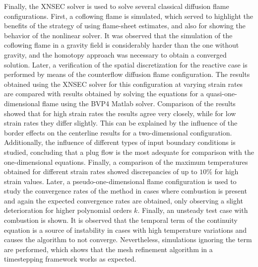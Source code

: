 Finally, the XNSEC solver is used to solve several classical diffusion flame configurations. First, a coflowing flame is simulated, which served to highlight the benefits of the strategy of using flame-sheet estimates, and also for showing the behavior of the nonlinear solver. It was observed that the simulation of the coflowing flame in a gravity field is considerably harder than the one without gravity, and the homotopy approach was necessary to obtain a converged solution. Later, a verification of the spatial discretization for the reactive case is performed by means of the counterflow diffusion flame configuration. The results obtained using the XNSEC solver for this configuration at varying strain rates are compared with results obtained by solving the equations for a quasi-one-dimensional flame using the BVP4 Matlab solver. Comparison of the results showed that for high strain rates the results agree very closely, while for low strain rates they differ slightly. This can be explained by the influence of the border effects on the centerline results for a two-dimensional configuration. Additionally, the influence of different types of input boundary conditions is studied, concluding that a plug flow is the most adequate for comparison with the one-dimensional equations. Finally, a comparison of the maximum temperatures obtained for different strain rates showed discrepancies of up to $10\%$ for high strain values. Later, a pseudo-one-dimensional flame configuration is used to study the convergence rates of the method in cases where combustion is present and again the expected convergence rates are obtained, only observing a slight deterioration for higher polynomial orders $k$. Finally, an unsteady test case with combustion is shown. It is observed that the temporal term of the continuity equation is a source of instability in cases with high temperature variations and causes the algorithm to not converge. Nevertheless, simulations ignoring the term are performed, which shows that the mesh refinement algorithm in a timestepping framework works as expected.
\FloatBarrier